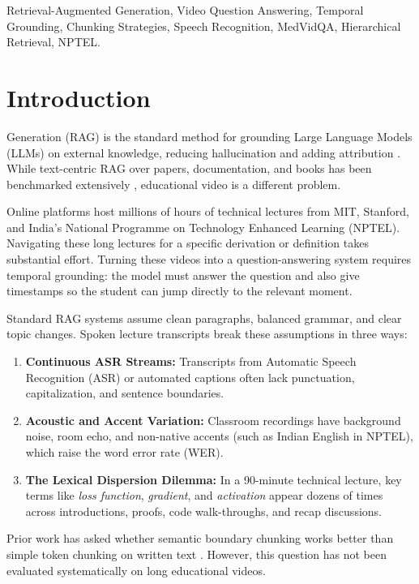 \documentclass[conference]{IEEEtran}
\begin{document}
\begin{IEEEkeywords}
Retrieval-Augmented Generation, Video Question Answering, Temporal Grounding, Chunking Strategies, Speech Recognition, MedVidQA, Hierarchical Retrieval, NPTEL.
\end{IEEEkeywords}

\section{Introduction}
 Generation (RAG) is the standard method for grounding Large Language Models (LLMs) on external knowledge, reducing hallucination and adding attribution \cite{lewis2020rag}. While text-centric RAG over papers, documentation, and books has been benchmarked extensively \cite{gao2023rag}, educational video is a different problem. 

Online platforms host millions of hours of technical lectures from MIT, Stanford, and India's National Programme on Technology Enhanced Learning (NPTEL). Navigating these long lectures for a specific derivation or definition takes substantial effort. Turning these videos into a question-answering system requires temporal grounding: the model must answer the question and also give timestamps so the student can jump directly to the relevant moment.

Standard RAG systems assume clean paragraphs, balanced grammar, and clear topic changes. Spoken lecture transcripts break these assumptions in three ways:
\begin{enumerate}
    \item \textbf{Continuous ASR Streams:} Transcripts from Automatic Speech Recognition (ASR) or automated captions often lack punctuation, capitalization, and sentence boundaries.
    \item \textbf{Acoustic and Accent Variation:} Classroom recordings have background noise, room echo, and non-native accents (such as Indian English in NPTEL), which raise the word error rate (WER).
    \item \textbf{The Lexical Dispersion Dilemma:} In a 90-minute technical lecture, key terms like \textit{loss function}, \textit{gradient}, and \textit{activation} appear dozens of times across introductions, proofs, code walk-throughs, and recap discussions.
\end{enumerate}

Prior work has asked whether semantic boundary chunking works better than simple token chunking on written text \cite{qu2024semantic}. However, this question has not been evaluated systematically on long educational videos. 
\end{document}
